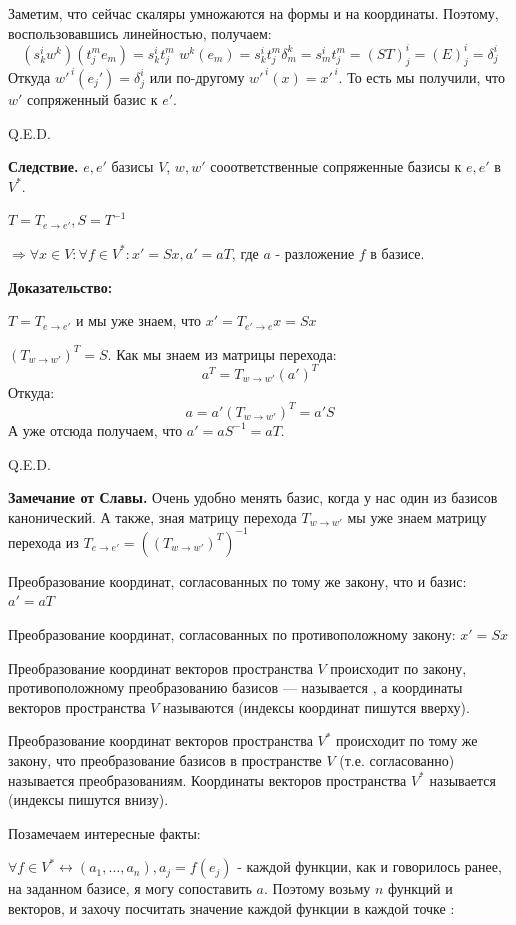 Заметим, что сейчас скаляры умножаются на формы и на координаты. Поэтому, воспользовавшись линейностью, получаем:
$$(s^i_k w^k)(t_j^me_m) = s^i_k t^m_j \, \,w^k(e_m) = s^i_k t^m_j \delta_m^k =s^i_mt^m_j= (ST)^i_j = (E)^i_j  = \delta^i_j$$
Откуда $w'^{\, i}(e_j')=\delta^i_j$ или по-другому $w'^{\, i}(x) =x'^{\,i}$. То есть мы получили, что $w'$ сопряженный базис к $e'$.

\hfill Q.E.D.

\textbf{Следствие.} $e,e'$ базисы $V$, $w,w'$ сооответственные сопряженные базисы к $e,e'$ в $V^*$.

$T = T_{e\rightarrow e'}, S = T^{-1}$

$ \Rightarrow \forall x \in V: \forall f \in V^*:x' = Sx, a' = aT$, где $a$ - разложение $f$ в базисе.

\textbf{Доказательство:}

$T=T_{e\rightarrow e'}$ и мы уже знаем, что $x' = T_{e'\rightarrow e}x = Sx$

$(T_{w\rightarrow w'})^T = S$. Как мы знаем из матрицы перехода:
$$a^T = T_{w\rightarrow w'}(a')^T$$
Откуда:
$$a = a'(T_{w\rightarrow w'})^T = a'S$$
А уже отсюда получаем, что $a' = aS^{-1} = aT$.

\hfill Q.E.D.

\textbf{Замечание от Славы.} Очень удобно менять базис, когда у нас один из базисов канонический. А также, зная матрицу перехода $T_{w\rightarrow w'}$ мы уже знаем матрицу перехода из $T_{e\rightarrow e'} =((T_{w\rightarrow w'})^T)^{-1} $


Преобразование координат, согласованных по тому же закону, что и базис:
$a' =a T$

Преобразование координат, согласованных по противоположному закону:
$x' = Sx$

 Преобразование координат векторов пространства $V$ происходит по закону, противоположному преобразованию базисов --- называется , а координаты векторов пространства $V$ называются  (индексы координат пишутся вверху).

 Преобразование координат векторов пространства $V^*$ происходит по тому же закону, что преобразование базисов в пространстве $V$ (т.е. согласованно) называется  преобразованиям.
Координаты векторов пространства $V^* $ называется  (индексы пишутся внизу).

Позамечаем интересные факты:

$\forall f \in V^* \leftrightarrow (a_1,\ldots, a_n), a_j = f(e_j)$ - каждой функции, как и говорилось ранее, на заданном базисе, я могу сопоставить $a$. Поэтому возьму $n$ функций и векторов, и захочу посчитать значение каждой функции в каждой точке :

